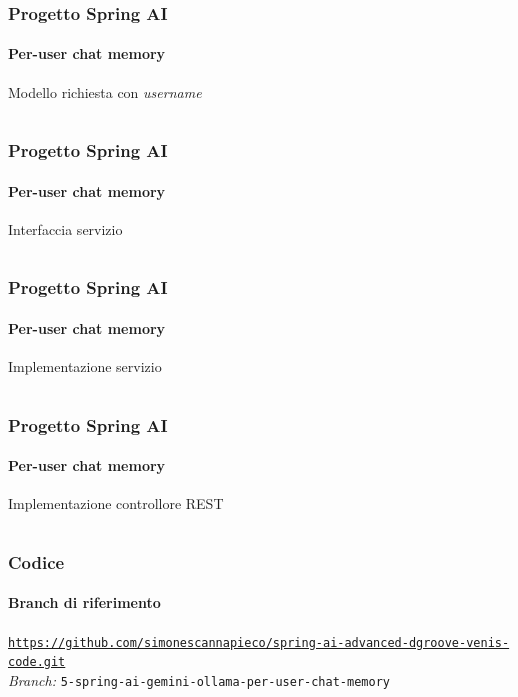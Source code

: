 %
\begin{frame}[t,fragile] \frametitle{Progetto Spring AI}
    \framesubtitle{Per-user chat memory}
        \begin{block}{Modello richiesta con \textit{username}}
			{\tiny\inputminted{java}{code/QuestionRequest.java}}
    	\end{block}
\end{frame}
%
\begin{frame}[t,fragile] \frametitle{Progetto Spring AI}
    \framesubtitle{Per-user chat memory}
        \begin{block}{Interfaccia servizio}
			{\tiny\inputminted{java}{code/QuestionService.java}}
    	\end{block}
\end{frame}
%
\begin{frame}[t,fragile] \frametitle{Progetto Spring AI}
    \framesubtitle{Per-user chat memory}
        \vspace*{-.7cm}
        \begin{block}{Implementazione servizio}
			{\tiny\inputminted{java}{code/QuestionServiceImpl.java}}
    	\end{block}
\end{frame}
%
\begin{frame}[t,fragile] \frametitle{Progetto Spring AI}
    \framesubtitle{Per-user chat memory}
    	\vspace*{-.7cm}
        \begin{block}{Implementazione controllore REST}
			{\tiny\inputminted{java}{code/QuestionController.java}}
    	\end{block}
\end{frame}
%
\begin{frame}[fragile] \frametitle{Codice}
    \framesubtitle{Branch di riferimento}
	\begin{center}
		{\scriptsize \href{https://github.com/simonescannapieco/spring-ai-advanced-dgroove-venis-code.git}{\texttt{https://github.com/simonescannapieco/spring-ai-advanced-dgroove-venis-code.git}}}\\
		\textit{Branch:} \alert{\texttt{5-spring-ai-gemini-ollama-per-user-chat-memory}}
	\end{center}
\end{frame}
%
